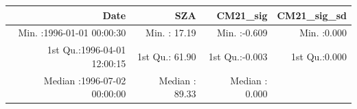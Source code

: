 \documentclass[
  10pt,
  a4paper,oneside]{article}
\begin{document}
\begin{longtable}[]{@{}rrrr@{}}
\toprule
\begin{minipage}[b]{0.33\columnwidth}\raggedleft
Date\strut
\end{minipage} & \begin{minipage}[b]{0.19\columnwidth}\raggedleft
SZA\strut
\end{minipage} & \begin{minipage}[b]{0.19\columnwidth}\raggedleft
CM21\_sig\strut
\end{minipage} & \begin{minipage}[b]{0.19\columnwidth}\raggedleft
CM21\_sig\_sd\strut
\end{minipage}\tabularnewline
\midrule
\endhead
\begin{minipage}[t]{0.33\columnwidth}\raggedleft
Min. :1996-01-01 00:00:30\strut
\end{minipage} & \begin{minipage}[t]{0.19\columnwidth}\raggedleft
Min. : 17.19\strut
\end{minipage} & \begin{minipage}[t]{0.19\columnwidth}\raggedleft
Min. :-0.609\strut
\end{minipage} & \begin{minipage}[t]{0.19\columnwidth}\raggedleft
Min. :0.000\strut
\end{minipage}\tabularnewline
\begin{minipage}[t]{0.33\columnwidth}\raggedleft
1st Qu.:1996-04-01 12:00:15\strut
\end{minipage} & \begin{minipage}[t]{0.19\columnwidth}\raggedleft
1st Qu.: 61.90\strut
\end{minipage} & \begin{minipage}[t]{0.19\columnwidth}\raggedleft
1st Qu.:-0.003\strut
\end{minipage} & \begin{minipage}[t]{0.19\columnwidth}\raggedleft
1st Qu.:0.000\strut
\end{minipage}\tabularnewline
\begin{minipage}[t]{0.33\columnwidth}\raggedleft
Median :1996-07-02 00:00:00\strut
\end{minipage} & \begin{minipage}[t]{0.19\columnwidth}\raggedleft
Median : 89.33\strut
\end{minipage} & \begin{minipage}[t]{0.19\columnwidth}\raggedleft
Median : 0.000\strut
\end{minipage} & \begin{minipage}[t]{0.19\columnwidth}\raggedleft

\end{minipage}
\end{longtable}
\end{document}
